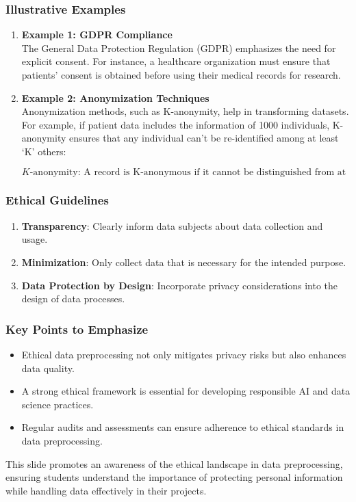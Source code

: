 \documentclass[aspectratio=169]{beamer}
\begin{document}
\begin{frame}[fragile]
    \frametitle{Illustrative Examples}
    \begin{enumerate}
        \item \textbf{Example 1: GDPR Compliance} \\
        The General Data Protection Regulation (GDPR) emphasizes the need for explicit consent. For instance, a healthcare organization must ensure that patients' consent is obtained before using their medical records for research.
        
        \item \textbf{Example 2: Anonymization Techniques} \\
        Anonymization methods, such as K-anonymity, help in transforming datasets. For example, if patient data includes the information of 1000 individuals, K-anonymity ensures that any individual can’t be re-identified among at least ‘K’ others:
        
        \begin{equation}
        K\text{-anonymity: A record is K-anonymous if it cannot be distinguished from at least K-1 other records in the dataset}
        \end{equation}
    \end{enumerate}
\end{frame}

\begin{frame}[fragile]
    \frametitle{Ethical Guidelines}
    \begin{enumerate}
        \item \textbf{Transparency}: Clearly inform data subjects about data collection and usage.
        \item \textbf{Minimization}: Only collect data that is necessary for the intended purpose.
        \item \textbf{Data Protection by Design}: Incorporate privacy considerations into the design of data processes.
    \end{enumerate}
\end{frame}

\begin{frame}[fragile]
    \frametitle{Key Points to Emphasize}
    \begin{itemize}
        \item Ethical data preprocessing not only mitigates privacy risks but also enhances data quality.
        \item A strong ethical framework is essential for developing responsible AI and data science practices.
        \item Regular audits and assessments can ensure adherence to ethical standards in data preprocessing.
    \end{itemize}
    This slide promotes an awareness of the ethical landscape in data preprocessing, ensuring students understand the importance of protecting personal information while handling data effectively in their projects.
\end{frame}
\end{document}
